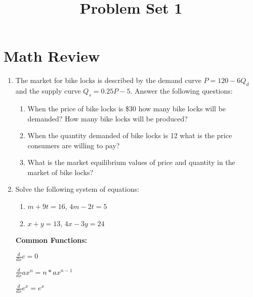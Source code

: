 \documentclass[11pt]{article}
\title{Problem Set 1}
\begin{document}
  
\section*{Math Review}

\begin{enumerate}
  \item The market for bike locks is described by the demand curve $P = 120 - 6Q_d$ and the supply curve $Q_s = 0.25P - 5$. Answer the following questions:

    \begin{enumerate}
      \item When the price of bike locks is \$30 how many bike locks will be demanded? How many bike locks will be produced?

      \item When the quantity demanded of bike locks is 12 what is the price consumers are willing to pay?

      \item What is the market equilibrium values of price and quantity in the market of bike locks?
    \end{enumerate}



  \vspace*{70mm} 
  \item Solve the following system of equations:
  
  \begin{multicols}{2}
    \begin{enumerate}
      \item $m + 9t = 16$, $4m - 2t = 5$
      
      \item $x + y = 13$, $4x - 3y = 24$
    \end{enumerate}
  \end{multicols}


  \newpage
  \begin{tcolorbox}[title= {\bf Helpful Derivative Formulae:}]
    \begin{multicols}{2}
        {\bf Common Functions:}

        \vspace{5mm}  
        $\frac{d}{dx} c = 0$
        
        \vspace{5mm}  
        $\frac{d}{dx} ax^n = n*a x^{n-1}$

        \vspace{5mm}  
        $\frac{d}{dx} e^x = e^x$


\end{multicols}
\end{tcolorbox}
\end{enumerate}
\end{document}

